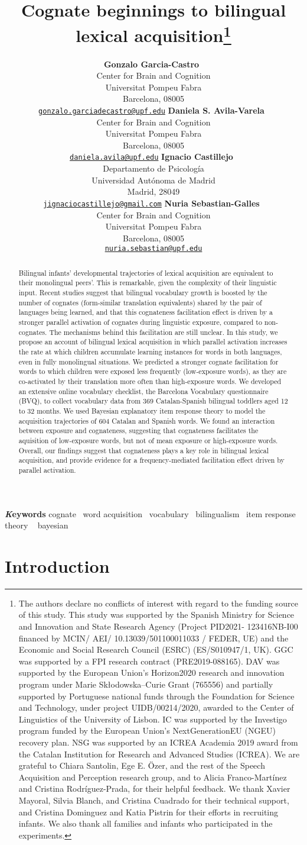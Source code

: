 \documentclass[
]{article}
\title{Cognate beginnings to bilingual lexical acquisition\thanks{The
authors declare no conflicts of interest with regard to the funding
source of this study. This study was supported by the Spanish Ministry
for Science and Innovation and State Research Agency (Project PID2021-
123416NB-I00 financed by MCIN/ AEI/ 10.13039/501100011033 / FEDER, UE)
and the Economic and Social Research Council (ESRC) (ES/S010947/1, UK).
GGC was supported by a FPI research contract (PRE2019-088165). DAV was
supported by the European Union's Horizon2020 research and innovation
program under Marie Skłodowska--Curie Grant (765556) and partially
supported by Portuguese national funds through the Foundation for
Science and Technology, under project UIDB/00214/2020, awarded to the
Center of Linguistics of the University of Lisbon. IC was supported by
the Investigo program funded by the European Union's NextGenerationEU
(NGEU) recovery plan. NSG was supported by an ICREA Academia 2019 award
from the Catalan Institution for Research and Advanced Studies (ICREA).
We are grateful to Chiara Santolin, Ege E. Özer, and the rest of the
Speech Acquisition and Perception research group, and to Alicia
Franco-Martínez and Cristina Rodríguez-Prada, for their helpful
feedback. We thank Xavier Mayoral, Silvia Blanch, and Cristina Cuadrado
for their technical support, and Cristina Dominguez and Katia Pistrin
for their efforts in recruiting infants. We also thank all families and
infants who participated in the experiments.}}
\author{
\textbf{Gonzalo Garcia-Castro}~\orcidlink{0000-0002-8553-4209}\\Center
for Brain and Cognition\\Universitat Pompeu Fabra\\Barcelona,
08005\\\texttt{\href{mailto:gonzalo.garciadecastro@upf.edu}{gonzalo.garciadecastro@upf.edu}}\And
\textbf{Daniela S. Avila-Varela}~\orcidlink{0000-0002-3518-8117}\\Center
for Brain and Cognition\\Universitat Pompeu Fabra\\Barcelona,
08005\\\texttt{\href{mailto:daniela.avila@upf.edu}{daniela.avila@upf.edu}}\And
\textbf{Ignacio
Castillejo}~\orcidlink{0000-0001-7445-0416}\\Departamento de
Psicología\\Universidad Autónoma de Madrid\\Madrid,
28049\\\texttt{\href{mailto:jignaciocastillejo@gmail.com}{jignaciocastillejo@gmail.com}}\And
\textbf{Nuria Sebastian-Galles}~\orcidlink{0000-0001-6938-2498}\\Center
for Brain and Cognition\\Universitat Pompeu Fabra\\Barcelona,
08005\\\texttt{\href{mailto:nuria.sebastian@upf.edu}{nuria.sebastian@upf.edu}}}
\date{}
\begin{document}
\maketitle
\begin{abstract}
Bilingual infants' developmental trajectories of lexical acquisition are
equivalent to their monolingual peers'. This is remarkable, given the
complexity of their linguistic input. Recent studies suggest that
bilingual vocabulary growth is boosted by the number of cognates
(form-similar translation equivalents) shared by the pair of languages
being learned, and that this cognateness facilitation effect is driven
by a stronger parallel activation of cognates during linguistic
exposure, compared to non-cognates. The mechanisms behind this
facilitation are still unclear. In this study, we propose an account of
bilingual lexical acquisition in which parallel activation increases the
rate at which children accumulate learning instances for words in both
languages, even in fully monolingual situations. We predicted a stronger
cognate facilitation for words to which children were exposed less
frequently (low-exposure words), as they are co-activated by their
translation more often than high-exposure words. We developed an
extensive online vocabulary checklist, the Barcelona Vocabulary
questionnaire (BVQ), to collect vocabulary data from 369 Catalan-Spanish
bilingual toddlers aged 12 to 32 months. We used Bayesian explanatory
item response theory to model the acquisition trajectories of 604
Catalan and Spanish words. We found an interaction between exposure and
cognateness, suggesting that cognateness facilitates the aquisition of
low-exposure words, but not of mean exposure or high-exposure words.
Overall, our findings suggest that cognateness plays a key role in
bilingual lexical acquisition, and provide evidence for a
frequency-mediated facilitation effect driven by parallel activation.
\end{abstract}
{\bfseries \emph Keywords}
\def\sep{\textbullet\ }
cognate \sep word
acquisition \sep vocabulary \sep bilingualism \sep item response
theory \sep 
bayesian

\ifdefined\Shaded\renewenvironment{Shaded}{\begin{tcolorbox}[sharp corners, borderline west={3pt}{0pt}{shadecolor}, frame hidden, interior hidden, boxrule=0pt, enhanced, breakable]}{\end{tcolorbox}}\fi

\hypertarget{introduction}{%
\section{Introduction}\label{introduction}}
\end{document}
